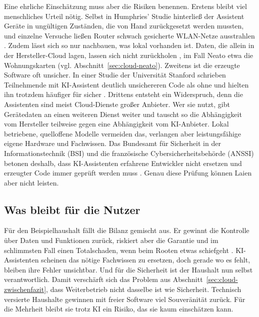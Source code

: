 Eine ehrliche Einschätzung muss aber die Risiken benennen. Erstens bleibt viel
menschliches Urteil nötig. Selbst in Humphries' Studie hinterließ der Assistent
Geräte in ungültigen Zuständen, die von Hand zurückgesetzt werden mussten, und
einzelne Versuche ließen Router schwach gesicherte WLAN-Netze ausstrahlen
\cite[S.~3]{humphries:2026}. Zudem lässt sich so nur nachbauen, was lokal
vorhanden ist. Daten, die allein in der Hersteller-Cloud lagen, lassen sich
nicht zurückholen \cite[S.~4]{humphries:2026}, im Fall Neato etwa die
Wohnungskarten (vgl. Abschnitt~\ref{sec:cloud-neato}). Zweitens ist die erzeugte Software oft unsicher. In
einer Studie der Universität Stanford schrieben Teilnehmende mit
\acrshort{KI}-Assistent deutlich unsichereren Code als ohne und hielten ihn
trotzdem häufiger für sicher \cite[S.~2785]{perry:2023}. Drittens entsteht ein
Widerspruch, denn die Assistenten sind meist Cloud-Dienste großer Anbieter.
Wer sie nutzt, gibt Gerätedaten an einen weiteren Dienst weiter und tauscht so
die Abhängigkeit vom Hersteller teilweise gegen eine Abhängigkeit vom
\acrshort{KI}-Anbieter. Lokal betriebene, quelloffene Modelle vermeiden das,
verlangen aber leistungsfähige eigene Hardware und Fachwissen. Das Bundesamt
für Sicherheit in der Informationstechnik (\acrshort{BSI}) und die französische
Cybersicherheitsbehörde (\acrshort{ANSSI}) betonen deshalb, dass
\acrshort{KI}-Assistenten erfahrene Entwickler nicht ersetzen und erzeugter
Code immer geprüft werden muss \cite[S.~3, 12]{bsi:2024ki}. Genau diese
Prüfung können Laien aber nicht leisten.

\subsection{Was bleibt für die Nutzer}\label{sec:lokal-kritik}

Für den Beispielhaushalt fällt die Bilanz gemischt aus. Er gewinnt die
Kontrolle über Daten und Funktionen zurück, riskiert aber die Garantie
\cite[Abschn.~\enquote{Installing Valetudo}]{valetudo:start} und im
schlimmsten Fall einen Totalschaden, wenn beim Rooten etwas schiefgeht
\cite[Abschn.~\enquote{Skills}]{valetudo:rooting}. \acrshort{KI}-Assistenten
scheinen das nötige Fachwissen zu ersetzen, doch gerade wo es fehlt, bleiben
ihre Fehler unsichtbar. Und für die Sicherheit ist der Haushalt nun selbst
verantwortlich. Damit verschärft sich das Problem aus
Abschnitt~\ref{sec:cloud-zwischenfazit}, dass Weiterbetrieb nicht dasselbe ist
wie Sicherheit. Technisch versierte Haushalte gewinnen mit freier Software viel
Souveränität zurück. Für die Mehrheit bleibt sie trotz \acrshort{KI} ein Risiko,
das sie kaum einschätzen kann.

